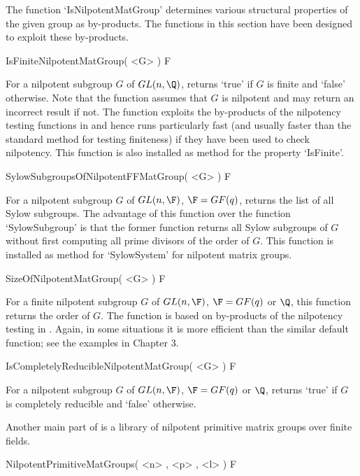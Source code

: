 
The function `IsNilpotentMatGroup' determines various structural
properties of the given group as by-products. The functions in
this section have been designed to exploit these by-products.

\> IsFiniteNilpotentMatGroup( <G> ) F

For a nilpotent subgroup $G$ of $GL(n,\Q)$, returns `true' if $G$
is finite and `false' otherwise. Note that the function assumes
that $G$ is nilpotent and may return an incorrect result if not.
The function exploits the by-products of the nilpotency testing
functions in  and hence runs particularly fast
(and usually faster than the standard {\GAP} method for testing
finiteness) if they have been used to check nilpotency. This
function is also installed as method for the property `IsFinite'.

\> SylowSubgroupsOfNilpotentFFMatGroup( <G> ) F

For a nilpotent subgroup $G$ of $GL(n,\F)$, $\F=GF(q)$, returns
the list of all Sylow subgroups. The advantage of this function over
the {\GAP} function `SylowSubgroup' is that the former function
returns all Sylow subgroups of $G$ without first computing all prime
divisors of the order of $G$. This function is installed as method
for `SylowSystem' for nilpotent matrix groups.

\> SizeOfNilpotentMatGroup( <G> ) F

For a finite nilpotent subgroup $G$ of $GL(n,\F)$, $\F=GF(q)$ or $\Q$, this
function returns the order of $G$. The function is based on by-products of
the nilpotency testing in . Again, in some situations it is
more efficient than the similar default {\GAP} function; see the examples
in Chapter 3.

\> IsCompletelyReducibleNilpotentMatGroup( <G> ) F

For a nilpotent subgroup $G$ of $GL(n,\F)$, $\F=GF(q)$ or $\Q$, returns
`true' if $G$ is completely reducible and `false' otherwise.


Another main part of  is a library of nilpotent
primitive matrix groups over finite fields.

\> NilpotentPrimitiveMatGroups( <n> , <p> , <l> ) F


